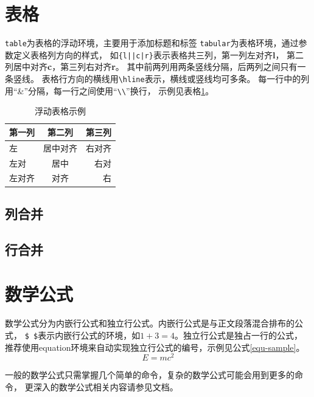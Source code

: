 \section{表格}
\label{sec-table}
\texttt{table}为表格的浮动环境，主要用于添加标题和标签
\texttt{tabular}为表格环境，通过参数定义表格列方向的样式，
如\verb+{l||c|r}+表示表格共三列，第一列左对齐{\bf l}，
第二列居中对齐{\bf c}，第三列右对齐{\bf r}。
其中前两列用两条竖线分隔，后两列之间只有一条竖线。
表格行方向的横线用\verb|\hline|表示，横线或竖线均可多条。
每一行中的列用“\&”分隔，每一行之间使用“\verb|\\|”换行，
示例见表格\ref{tab-sample}。
\begin{table}
    \centering
    \caption{浮动表格示例}
    \label{tab-sample}
    \begin{tabular}{l||c|r}
        \hline
        第一列 & 第二列   & 第三列 \\ \hline \hline
        左     & 居中对齐 & 右对齐 \\ \hline
        左对   & 居中     & 右对   \\ \hline
        左对齐 & 对齐     & 右     \\\hline
    \end{tabular}
\end{table}

\subsection{列合并}
\label{subsec-tab-col}

\subsection{行合并}
\label{subsec-tab-row}

\section{数学公式}
\label{sec-math}
数学公式分为内嵌行公式和独立行公式。内嵌行公式是与正文段落混合排布的公式，
\verb|$ $|表示内嵌行公式的环境，如$1+3=4$。独立行公式是独占一行的公式，
推荐使用equation环境来自动实现独立行公式的编号，示例见公式\ref{equ-sample}。
\begin{equation}
    \label{equ-sample}
    E=mc^2
\end{equation}

一般的数学公式只需掌握几个简单的命令，复杂的数学公式可能会用到更多的命令，
更深入的数学公式相关内容请参见文档。

